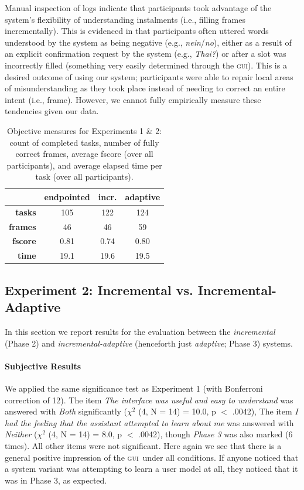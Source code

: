 \documentclass[11pt]{article}
\newcommand{\ui}[0]{\textsc{gui}}
\begin{document}
Manual inspection of logs indicate that participants took advantage of the system's flexibility of understanding instalments (i.e., filling frames incrementally). This is evidenced in that participants often uttered words understood by the system as being negative (e.g., \emph{nein}/\emph{no}), either as a result of an explicit confirmation request by the system (e.g., \emph{Thai?}) or after a slot was incorrectly filled (something very easily determined through the \ui). This is a desired outcome of using our system; participants were able to repair local areas of misunderstanding as they took place instead of needing to correct an entire intent (i.e., frame). However, we cannot fully empirically measure these tendencies given our data. 

\begin{table}
\centering
 \begin{tabular}{|r|c|c|c|}
\hline
                     & \textbf{endpointed} & \textbf{incr.} & \textbf{adaptive} \\
\hline
\textbf{tasks} & 105 & 122 & 124  \\
\textbf{frames} & 46 & 46 & 59 \\
\textbf{fscore} & 0.81 & 0.74 & 0.80 \\
\textbf{time} & 19.1 & 19.6 & 19.5 \\
 \hline
\end{tabular}
\caption{Objective measures for Experiments 1 \& 2: count of completed tasks, number of fully correct frames, average fscore (over all participants), and average elapsed time per task (over all participants).}
\label{tab:objscores}
\end{table}

\subsection{Experiment 2: Incremental vs. Incremental-Adaptive}
\label{section:exp2}

In this section we report results for the evaluation between the \emph{incremental} (Phase 2) and \emph{incremental-adaptive} (henceforth just \emph{adaptive}; Phase 3) systems. 

\paragraph{Subjective Results}  We applied the same significance test as Experiment 1 (with Bonferroni correction of 12). The item \emph{The interface was useful and easy to understand} was answered with \emph{Both} significantly  ($ \chi^2 $ (4, N = 14) = 10.0, p $<$ .0042), The item \emph{I had the feeling that the assistant attempted to learn about me} was answered with \emph{Neither} ($ \chi^2 $ (4, N = 14) = 8.0, p $<$ .0042), though \emph{Phase 3} was also marked (6 times). All other items were not significant. Here again we see that there is a general positive impression of the \ui\ under all conditions. If anyone noticed that a system variant was attempting to learn a user model at all, they noticed that it was in Phase 3, as expected. 
\end{document}
